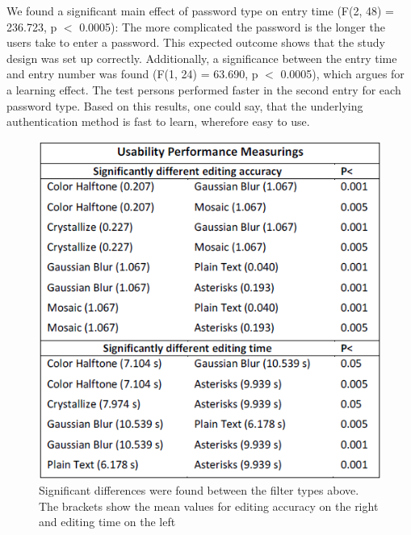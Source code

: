 \documentclass{sigchi}
\begin{document}
We found a significant main effect of password type on entry time (F(2, 48) = 236.723, p $<$ 0.0005): The more complicated the password is the longer the users take to enter a password. This expected outcome shows that the study design was set up correctly.  Additionally, a significance between the entry time and entry number was  found (F(1, 24) = 63.690, p $<$ 0.0005), which argues for a learning effect. The test persons performed faster in the second entry for each password type.  Based on this results, one could say, that the underlying authentication method is fast to learn, wherefore easy to use.

\begin{figure}[h]
    \centering
    \includegraphics[width=\columnwidth]{figures/usabilityperformace_figure.png}
    \caption{Significant differences were found between the filter types above. The brackets show the mean values for editing accuracy on the right and editing time on the left}
    \label{fig:sig_table}
    \vspace{-5mm}
\end{figure}
\end{document}
